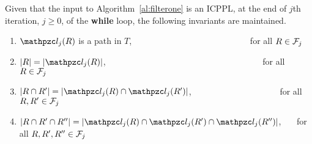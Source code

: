 \begin{lemma}
  \label{lem:invar1} Given that the input to Algorithm~\ref{al:filterone} is
  an ICPPL, at the end of $j$th iteration, $j \ge 0$, of the {\bf
    while} loop, the following invariants are maintained.
  \begin{enumerate}[I {\ }] %
    \singlespacing
  \item $\cl_j(R)$ is a path in $T$, \ \ \ \ \ \ \ \ \ \ \ \ \ \ \ \ \
    \ \ \ \ \ \ \ \ \ \ for all $R \in {\cal F}_j$%
  \item $|R| = |\cl_j(R)|$, \ \ \ \ \ \ \ \ \ \ \ \ \ \ \ \ \ \ \ \ \
    \ \ \ \ \ \ \ \ \ \ \ \ \ \ \ for all $R \in
    {\cal F}_j$%
  \item $|R \cap R'| = |\cl_j(R) \cap \cl_j(R')|$, \ \ \ \ \ \ \ \ \ \
    \ \ \ \ \ \ \ \ \ \ for all $R, R' \in {\cal F}_j$%
  \item $|R \cap R' \cap R''|=|\cl_j(R) \cap \cl_j(R') \cap
    \cl_j(R'')|$, \ \ \ for all $R, R', R'' \in {\cal F}_j$
  \end{enumerate}
\end{lemma}
